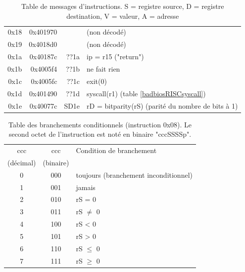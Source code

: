 \documentclass[a4paper,10pt]{article}
\begin{document}
\begin{table}[h]
\begin{center}
\begin{tabular}{|r|r|r|l|}
  0x18 & 0x401970 &           & (non décodé) \\
  0x19 & 0x4018d0 &           & (non décodé) \\
  0x1a & 0x40187c &      ??1a & ip = r15 ("return") \\
  0x1b & 0x4005f4 &      ??1b & ne fait rien \\
  0x1c & 0x4005fc &      ??1c & exit(0) \\
  0x1d & 0x401490 &      ??1d & syscall(r1) (table \ref{badbiosRISCsyscall}) \\
  0x1e & 0x40077c &      SD1e & rD = bitparity(rS) (parité du nombre de bits à 1) \\
  \hline
\end{tabular}
\end{center}
\caption{Table de messages d'instructions. S = registre source, D = registre destination, V = valeur, A = adresse}
\label{badbiosRISCtable}
\end{table}

\begin{table}[h]
\begin{center}
\begin{tabular}{|c|c|l|}
  \hline
  ccc & ccc & Condition de branchement \\
  (décimal) & (binaire) & \\
  \hline
  0 & 000 & toujours (branchement inconditionnel) \\
  1 & 001 &  jamais \\
  2 & 010 &  rS = 0 \\
  3 & 011 &  rS $\neq$ 0 \\
  4 & 100 &  rS < 0 \\
  5 & 101 &  rS > 0 \\
  6 & 110 &  rS $\leq$ 0 \\
  7 & 111 &  rS $\geq$ 0 \\
  \hline
\end{tabular}
\end{center}
\caption{Table des branchements conditionnels (instruction 0x08). Le second octet de l'instruction est noté en binaire "cccSSSSp".}
\label{badbiosRISCcondbranch}
\end{table}
\end{document}
